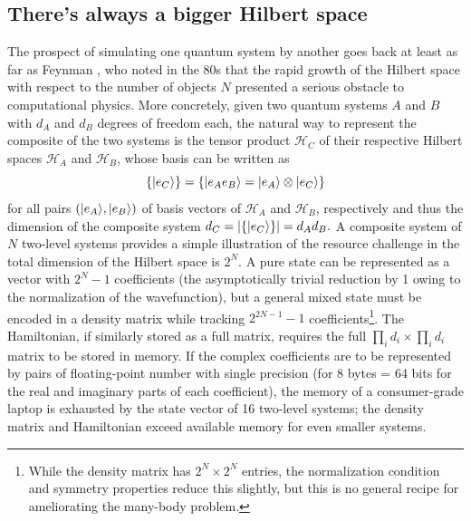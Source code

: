 	

\subsection{There's always a bigger Hilbert space}


	The prospect of simulating one quantum system by another goes back at least as far as Feynman \cite{Feynman82}, who noted in the 80s that the rapid growth of the Hilbert space with respect to the number of objects $N$ presented a serious obstacle to computational physics.
	More concretely, given two quantum systems $A$ and $B$ with $d_A$ and $d_B$ degrees of freedom each, the natural way to represent the composite of the two systems is the tensor product $\mathcal{H}_C$ of their respective Hilbert spaces $\mathcal{H}_A$ and $\mathcal{H}_B$, whose basis can be written as
	\begin{equation}
	\{|e_C\rangle\} = \{|e_A e_B\rangle=|e_A\rangle\otimes|e_C\rangle\}
	\end{equation}
	for all pairs $(|e_A\rangle,|e_B\rangle)$ of basis vectors of $\mathcal{H}_A$ and $\mathcal{H}_B$, respectively and thus the dimension of the composite system $d_C = |\{|e_C\rangle\}| = d_A d_B.$ A composite system of $N$ two-level systems provides a simple illustration of the resource challenge in the total dimension of the Hilbert space is $2^N$.
	A pure state can be represented as a vector with $2^N-1$ coefficients (the asymptotically trivial reduction by 1 owing to the normalization of the wavefunction), but a general mixed state must be encoded in a density matrix while tracking $2^{2N-1}-1$  coefficients\footnote{While the density matrix has $2^N\times2^N$ entries, the normalization condition and symmetry properties reduce this slightly, but this is no general recipe for ameliorating the many-body problem.}.
	The Hamiltonian, if similarly stored as a full matrix, requires the full $\prod_i d_i\times\prod_i d_i$ matrix to be stored in memory.
	If the complex coefficients are to be represented by pairs of floating-point number with single precision (for 8 bytes = 64 bits for the real and imaginary parts of each coefficient), the memory of a consumer-grade laptop is exhausted by the state vector of 16 two-level systems; the density matrix and Hamiltonian exceed available memory for even smaller systems.

